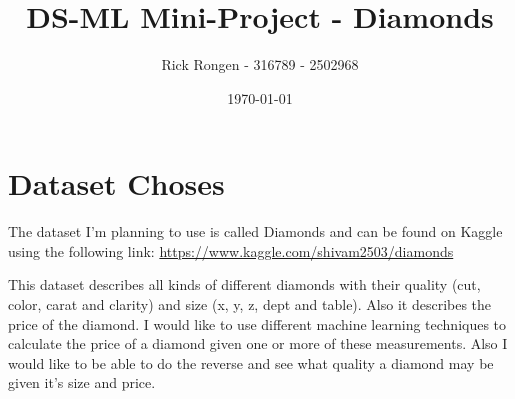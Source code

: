 \documentclass{scrreprt}
\author{Rick Rongen - 316789 - 2502968}
\title{DS-ML Mini-Project - Diamonds}
\date{\today}
\begin{document}
	\maketitle
	\tableofcontents
	\chapter{Dataset Choses}
		The dataset I'm planning to use is called Diamonds and can be found on Kaggle using the following link: \url{https://www.kaggle.com/shivam2503/diamonds}\par
		
		This dataset describes all kinds of different diamonds with their quality (cut, color, carat and clarity) and size (x, y, z, dept and table). Also it describes the price of the diamond. I would like to use different machine learning techniques to calculate the price of a diamond given one or more of these measurements. Also I would like to be able to do the reverse and see what quality a diamond may be given it's size and price.
		
\end{document}
